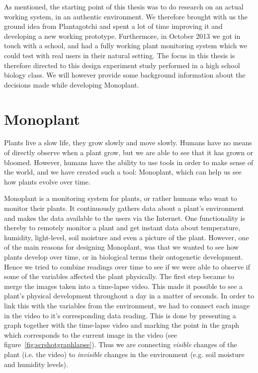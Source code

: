 As mentioned, the starting point of this thesis was to do research on an actual working system, in an authentic environment. We therefore brought with us the ground idea from Plantagotchi and spent a lot of time improving it and developing a new working prototype. Furthermore, in October 2013 we got in touch with a school, and had a fully working plant monitoring system which we could test with real users in their natural setting. The focus in this thesis is therefore directed to this design experiment study performed in a high school biology class. We will however provide some background information about the decisions made while developing Monoplant. 


\section{Monoplant}
Plants live a slow life, they grow slowly and move slowly. Humans have no means of directly observe when a plant grow, but we are able to see that it has grown or bloomed. However, humans have the ability to use tools in order to make sense of the world, and we have created such a tool: Monoplant, which can help us see how plants evolve over time.

Monoplant is a monitoring system for plants, or rather humans who want to monitor their plants. It continuously gathers data about a plant's environment and makes the data available to the users via the Internet. One functionality is thereby to remotely monitor a plant and get instant data about temperature, humidity, light-level, soil moisture and even a picture of the plant. However, one of the main reasons for designing Monoplant, was that we wanted to see how plants develop over time, or in biological terms their ontogenetic development. Hence we tried to combine readings over time to see if we were able to observe if some of the variables affected the plant physically. The first step became to merge the images taken into a time-lapse video. This made it possible to see a plant's physical development throughout a day in a matter of seconds. In order to link this with the variables from the environment, we had to connect each image in the video to it's corresponding data reading. This is done by presenting a graph together with the time-lapse video and marking the point in the graph which corresponds to the current image in the video (see figure~\ref{fig:scrshotgraphlapse}). Thus we are connecting \emph{visible} changes of the plant (i.e. the video) to \emph{invisible} changes in the environment (e.g. soil moisture and humidity levels).


